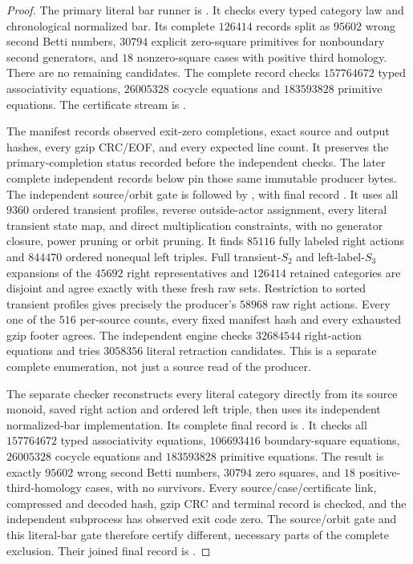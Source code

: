 \begin{proof}
The primary literal bar runner is
.
It checks every typed category law and chronological
normalized bar.  Its complete $126414$ records split as
$95602$ wrong second Betti numbers, $30794$ explicit
zero-square primitives for nonboundary second generators,
and $18$ nonzero-square cases with positive third homology.
There are no remaining candidates.  The complete record
checks $157764672$ typed associativity equations,
$26005328$ cocycle equations and $183593828$ primitive
equations.  The certificate stream is
.

The manifest
records observed exit-zero completions, exact source and
output hashes, every gzip CRC/EOF, and every expected
line count.  It preserves the primary-completion status recorded before
the independent checks.  The later complete independent
records below pin those same immutable producer bytes.
The independent source/orbit gate is
 followed by
,
with final record
.
It uses all $9360$ ordered transient profiles, reverse
outside-actor assignment, every literal transient state map,
and direct multiplication constraints, with no generator
closure, power pruning or orbit pruning.  It finds $85116$
fully labeled right actions and $844470$ ordered nonequal
left triples.  Full transient-$S_2$ and left-label-$S_3$
expansions of the $45692$ right representatives and $126414$
retained categories are disjoint and agree exactly with
these fresh raw sets.  Restriction to sorted transient
profiles gives precisely the producer's $58968$ raw right
actions.  Every one of the $516$ per-source counts, every
fixed manifest hash and every exhausted gzip footer agrees.
The independent engine checks $32684544$ right-action
equations and tries $3058356$ literal retraction candidates.
This is a separate complete enumeration, not just a source
read of the producer.

The separate checker
reconstructs every literal category directly from its source
monoid, saved right action and ordered left triple, then
uses its independent normalized-bar implementation.
Its complete final record is
.
It checks all $157764672$ typed associativity equations,
$106693416$ boundary-square equations, $26005328$ cocycle
equations and $183593828$ primitive equations.  The result
is exactly $95602$ wrong second Betti numbers, $30794$
zero squares, and $18$ positive-third-homology cases,
with no survivors.  Every source/case/certificate link,
compressed and decoded hash, gzip CRC and terminal record
is checked, and the independent subprocess has observed
exit code zero.  The source/orbit gate and this literal-bar
gate therefore certify different, necessary parts of the
complete exclusion.  Their joined final record is
.
\end{proof}

